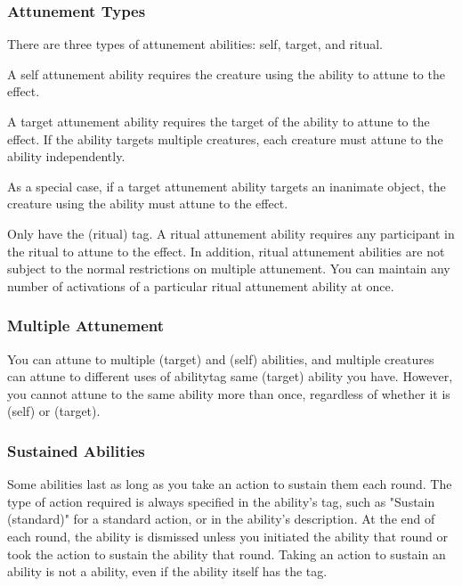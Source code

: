             \subsubsection{Attunement Types}\label{Attunement Types}
                There are three types of attunement abilities: self, target, and ritual.

                 A self attunement ability requires the creature using the ability to attune to the effect.

                 A target attunement ability requires the target of the ability to attune to the effect.
                If the ability targets multiple creatures, each creature must attune to the ability independently.

                As a special case, if a target attunement ability targets an inanimate object, the creature using the ability must attune to the effect.

                 Only  have the  (ritual) tag.
                A ritual attunement ability requires any participant in the ritual to attune to the effect.
                In addition, ritual attunement abilities are not subject to the normal restrictions on multiple attunement.
                You can maintain any number of activations of a particular ritual attunement ability at once.

            \subsubsection{Multiple Attunement}
                You can attune to multiple  (target) and  (self) abilities, and multiple creatures can attune to different uses of abilitytag same  (target) ability you have.
                However, you cannot attune to the same ability more than once, regardless of whether it is  (self) or  (target).

        \subsubsection{Sustained Abilities}\label{Sustained Abilities}
            Some abilities last as long as you take an action to sustain them each round.
            The type of action required is always specified in the ability's tag, such as "Sustain (standard)" for a standard action, or in the ability's description.
            At the end of each round, the ability is dismissed unless you initiated the ability that round or took the action to sustain the ability that round.
            Taking an action to sustain an ability is not a  ability, even if the ability itself has the  tag.

